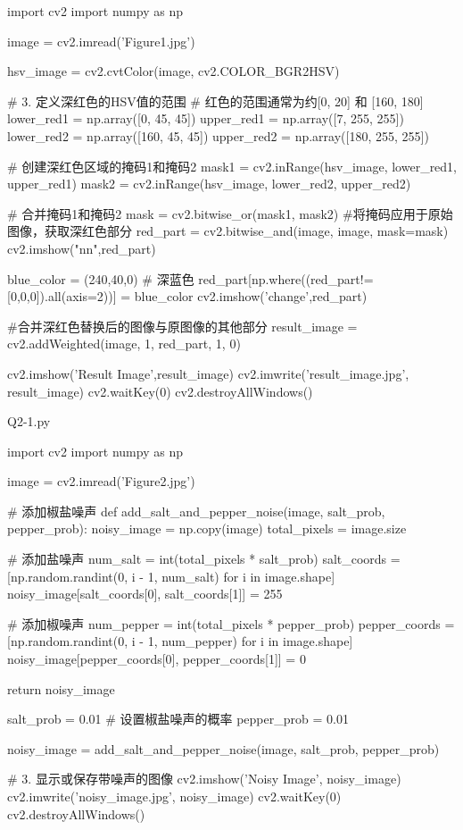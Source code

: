 \documentclass[11pt]{article}
\begin{document}
\begin{python}
import cv2
import numpy as np

image = cv2.imread('Figure1.jpg')

hsv_image = cv2.cvtColor(image, cv2.COLOR_BGR2HSV)

# 3. 定义深红色的HSV值的范围
# 红色的范围通常为约[0, 20] 和 [160, 180]
lower_red1 = np.array([0, 45, 45])
upper_red1 = np.array([7, 255, 255])
lower_red2 = np.array([160, 45, 45])
upper_red2 = np.array([180, 255, 255])

# 创建深红色区域的掩码1和掩码2
mask1 = cv2.inRange(hsv_image, lower_red1, upper_red1)
mask2 = cv2.inRange(hsv_image, lower_red2, upper_red2)

# 合并掩码1和掩码2
mask = cv2.bitwise_or(mask1, mask2)
#将掩码应用于原始图像，获取深红色部分
red_part = cv2.bitwise_and(image, image, mask=mask)
cv2.imshow("nn",red_part)

blue_color = (240,40,0)  # 深蓝色
red_part[np.where((red_part!=[0,0,0]).all(axis=2))] = blue_color
cv2.imshow('change',red_part)

#合并深红色替换后的图像与原图像的其他部分
result_image = cv2.addWeighted(image, 1, red_part, 1, 0)

cv2.imshow('Result Image',result_image)
cv2.imwrite('result_image.jpg', result_image)
cv2.waitKey(0)
cv2.destroyAllWindows()
\end{python}
\vspace*{1em}
\begin{large}
    \noindent Q2-1.py
\end{large}
\begin{python}
import cv2
import numpy as np

image = cv2.imread('Figure2.jpg')

# 添加椒盐噪声
def add_salt_and_pepper_noise(image, salt_prob, pepper_prob):
    noisy_image = np.copy(image)
    total_pixels = image.size

    # 添加盐噪声
    num_salt = int(total_pixels * salt_prob)
    salt_coords = [np.random.randint(0, i - 1, num_salt) for i in image.shape]
    noisy_image[salt_coords[0], salt_coords[1]] = 255

    # 添加椒噪声
    num_pepper = int(total_pixels * pepper_prob)
    pepper_coords = [np.random.randint(0, i - 1, num_pepper) for i in image.shape]
    noisy_image[pepper_coords[0], pepper_coords[1]] = 0

    return noisy_image

salt_prob = 0.01  # 设置椒盐噪声的概率
pepper_prob = 0.01

noisy_image = add_salt_and_pepper_noise(image, salt_prob, pepper_prob)

# 3. 显示或保存带噪声的图像
cv2.imshow('Noisy Image', noisy_image)
cv2.imwrite('noisy_image.jpg', noisy_image)
cv2.waitKey(0)
cv2.destroyAllWindows()
\end{python}
\end{document}
